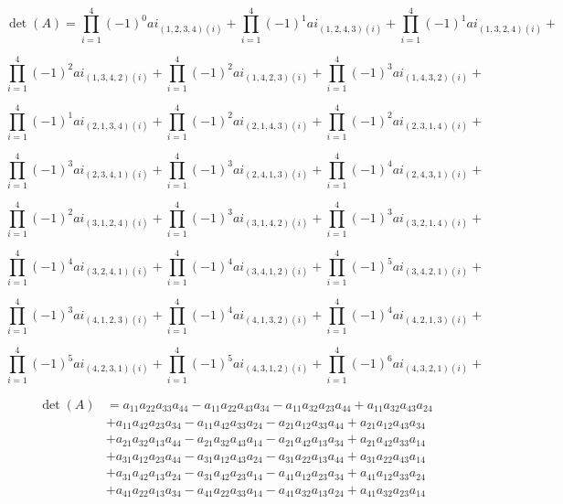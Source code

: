 \documentclass[12pt]{article}
\begin{document}
\paragraph{}

$$\operatorname{det}(A)= \prod_{i=1}^{4} (-1)^0  ai_{(1, 2, 3, 4) (i)} + 
\prod_{i=1}^{4} (-1)^1  ai_{(1, 2, 4, 3) (i)} +
\prod_{i=1}^{4} (-1)^1  ai_{(1, 3, 2, 4) (i)} +$$

$$\prod_{i=1}^{4} (-1)^2  ai_{ (1, 3, 4, 2) (i)} + 
\prod_{i=1}^{4} (-1)^2  ai_{ (1, 4, 2, 3) (i)} +
\prod_{i=1}^{4} (-1)^3  ai_{ (1, 4, 3, 2) (i)} +$$

$$\prod_{i=1}^{4} (-1)^1  ai_{(2, 1, 3, 4) (i)} + 
\prod_{i=1}^{4} (-1)^2  ai_{(2, 1, 4, 3) (i)} +
\prod_{i=1}^{4} (-1)^2  ai_{(2, 3, 1, 4) (i)} +$$

$$\prod_{i=1}^{4} (-1)^3  ai_{(2, 3, 4, 1) (i)} + 
\prod_{i=1}^{4} (-1)^3  ai_{(2, 4, 1, 3) (i)} +
\prod_{i=1}^{4} (-1)^4  ai_{(2, 4, 3, 1) (i)} +$$

$$\prod_{i=1}^{4} (-1)^2  ai_{(3, 1, 2, 4) (i)} + 
\prod_{i=1}^{4} (-1)^3  ai_{(3, 1, 4, 2) (i)} +
\prod_{i=1}^{4} (-1)^3  ai_{(3, 2, 1, 4) (i)} +$$

$$\prod_{i=1}^{4} (-1)^4  ai_{(3, 2, 4, 1) (i)} + 
\prod_{i=1}^{4} (-1)^4  ai_{(3, 4, 1, 2) (i)} +
\prod_{i=1}^{4} (-1)^5  ai_{(3, 4, 2, 1)(i)} +$$

$$\prod_{i=1}^{4} (-1)^3  ai_{(4, 1, 2, 3) (i)} + 
\prod_{i=1}^{4} (-1)^4  ai_{(4, 1, 3, 2) (i)} +
\prod_{i=1}^{4} (-1)^4  ai_{(4, 2, 1, 3) (i)} +$$

$$\prod_{i=1}^{4} (-1)^5  ai_{(4, 2, 3, 1) (i)} + 
\prod_{i=1}^{4} (-1)^5  ai_{(4, 3, 1, 2) (i)} +
\prod_{i=1}^{4} (-1)^6  ai_{(4, 3, 2, 1) (i)} +$$

\newpage

\[
\begin{aligned}
\operatorname{det}(A) & =
a_{11} a_{22} a_{33} a_{44} -a_{11} a_{22} a_{43} a_{34} -a_{11} a_{32} a_{23} a_{44} +a_{11} a_{32} a_{43} a_{24} \\
& +a_{11} a_{42} a_{23} a_{34} -a_{11} a_{42} a_{33} a_{24} -a_{21} a_{12} a_{33} a_{44} +a_{21} a_{12} a_{43} a_{34} \\
& +a_{21} a_{32} a_{13} a_{44} -a_{21} a_{32} a_{43} a_{14} -a_{21} a_{42} a_{13} a_{34} +a_{21} a_{42} a_{33} a_{14} \\
& +a_{31} a_{12} a_{23} a_{44} -a_{31} a_{12} a_{43} a_{24} -a_{31} a_{22} a_{13} a_{44} +a_{31} a_{22} a_{43} a_{14} \\
& +a_{31} a_{42} a_{13} a_{24} -a_{31} a_{42} a_{23} a_{14} -a_{41} a_{12} a_{23} a_{34} +a_{41} a_{12} a_{33} a_{24} \\
&  +a_{41} a_{22} a_{13} a_{34} -a_{41} a_{22} a_{33} a_{14} -a_{41} a_{32} a_{13} a_{24} +a_{41} a_{32} a_{23} a_{14} 
\end{aligned}
\]
\end{document}
